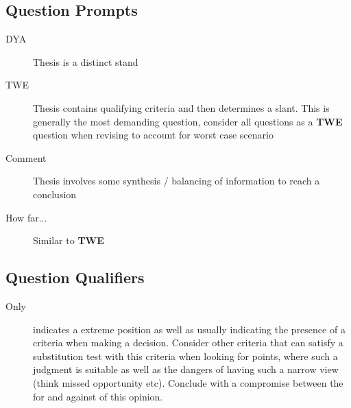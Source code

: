\documentclass[../../main]{subfiles}
\begin{document}
\subsection{Question Prompts}

\begin{description}
	\item[DYA] Thesis is a distinct stand
	\item[TWE] Thesis contains qualifying criteria and then determines a slant. This is generally the most demanding question, consider all questions as a \textbf{TWE} question when revising to account for worst case scenario
	\item[Comment] Thesis involves some synthesis / balancing of information to reach a conclusion
	\item[How far...] Similar to \textbf{TWE}
\end{description}

\subsection{Question Qualifiers}

\begin{description}
	\item[Only] indicates a extreme position as well as usually indicating the presence of a criteria when making a decision. Consider other criteria that can satisfy a substitution test with this criteria when looking for points, where such a judgment is suitable as well as the dangers of having such a narrow view (think missed opportunity etc). Conclude with a compromise between the for and against of this opinion.
	\item[]
\end{description}
\end{document}
